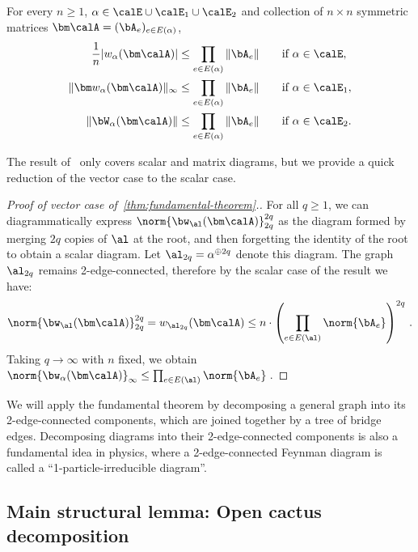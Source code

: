 \begin{theorem}\label{thm:fundamental-theorem}
    For every $n\ge 1$, 
    $\alpha\in \calE\cup \calE_1\cup \calE_2$
    and collection of $n\times n$ symmetric matrices 
    $\bm \calA = (\bA_e)_{e\in E(\alpha)}$,
    \begin{alignat*}{2}
        \frac 1 n |w_\alpha(\bm \calA)|&\le \prod_{e\in E(\alpha)} \|\bA_e\| \quad&&\text{if $\alpha\in\calE$}, \\
        \|\bm w_\alpha(\bm \calA)\|_\infty&\le \prod_{e\in E(\alpha)} \|\bA_e\| \quad&&\text{if $\alpha\in\calE_1$}, \\
        \|\bW_\alpha(\bm \calA)\|&\le \prod_{e\in E(\alpha)} \|\bA_e\| \quad&&\text{if $\alpha\in\calE_2$}.
    \end{alignat*}
\end{theorem}

\noindent The result of~\cite{bai2010spectral} only covers scalar and matrix diagrams, but we provide a quick reduction
of the vector case to the scalar case.

\begin{proof}[Proof of vector case of~\cref{thm:fundamental-theorem}.]
    For all $q \ge 1$, we can diagrammatically express $\norm{\bw_\al(\bm \calA)}_{2q}^{2q}$ as the diagram formed by merging $2q$ copies of $\al$ at the root, and then forgetting the identity of the root to obtain a scalar diagram.
    Let $\al_{2q} = \alpha^{\oplus 2q}$ denote this diagram.
    The graph $\al_{2q}$ remains 2-edge-connected, therefore by the scalar case of the result we have:
    \[
        \norm{\bw_\al(\bm \calA)}_{2q}^{2q} = w_{\al_{2q}}(\bm \calA) \leq n \cdot \left(\prod_{e \in E(\al)} \norm{\bA_e}\right)^{2q}\,.
    \]
    Taking $q \to \infty$ with $n$ fixed, we obtain $\norm{\bw_\alpha (\bm \calA)}_\infty \leq \prod_{e \in E(\al)} \norm{\bA_e}$\,.
\end{proof}

We will apply the fundamental theorem by decomposing a general graph into its 2-edge-connected components,
which are joined together by a tree of bridge edges.
Decomposing diagrams into their 2-edge-connected components is also a fundamental idea in physics, where a 2-edge-connected Feynman diagram is called a ``1-particle-irreducible diagram''.


\subsection{Main structural lemma: Open cactus decomposition}

